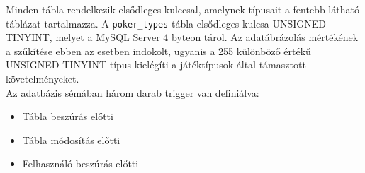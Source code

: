 


\hfill \break
Minden tábla rendelkezik elsődleges kulccsal, amelynek típusait a fentebb látható táblázat tartalmazza. A \texttt{poker\_types} tábla elsődleges kulcsa UNSIGNED TINYINT, melyet a MySQL Server 4 byteon tárol. Az adatábrázolás mértékének a szűkítése ebben az esetben indokolt, ugyanis a 255 különböző értékű UNSIGNED TINYINT típus kielégíti a játéktípusok által támasztott követelményeket. \\
Az adatbázis sémában három darab trigger van definiálva:
\begin{itemize}
\item Tábla beszúrás előtti
\item Tábla módosítás előtti
\item Felhasználó beszúrás előtti
\end{itemize}



